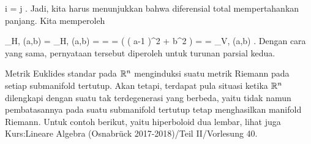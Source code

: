 {\mavergleichskette
{\vergleichskette
{ i
}
{ = }{ j
}
{  }{
}
{    }{
}
{   }{
}
}
{}{}{.}
Jadi, kita harus menunjukkan bahwa diferensial total mempertahankan panjang. Kita memperoleh

\mavergleichskettealigndrucklinks
{\vergleichskettealigndrucklinks
{  \Vert_{H, \psi(a,b) }
}
{ =} {  \Vert_{H, \psi(a,b) }
}
{ =} { {  }  \Vert
}
{ =} { {  } 
}
{ =} { {  } \left(  \left(  a-1  \right)^2 + b^2   \right)
}
}
{
\vergleichskettefortsetzungalign
{ =} { {  }
}
{ =} {  \Vert_{V, (a,b)}
}
{ } {}
{ } {}
}{}{.}
Dengan cara yang sama, pernyataan tersebut diperoleh untuk turunan parsial kedua.

}

Metrik Euklides standar pada ${\mathbb R}^n$ menginduksi suatu metrik Riemann pada setiap submanifold tertutup. Akan tetapi, terdapat pula situasi ketika ${\mathbb R}^n$ dilengkapi dengan suatu
tak terdegenerasi yang berbeda, yaitu tidak
namun pembatasannya pada suatu submanifold tertutup tetap menghasilkan manifold Riemann. Untuk contoh berikut, yaitu hiperboloid dua lembar, lihat juga Kurs:Lineare Algebra (Osnabrück 2017-2018)/Teil II/Vorlesung 40.

